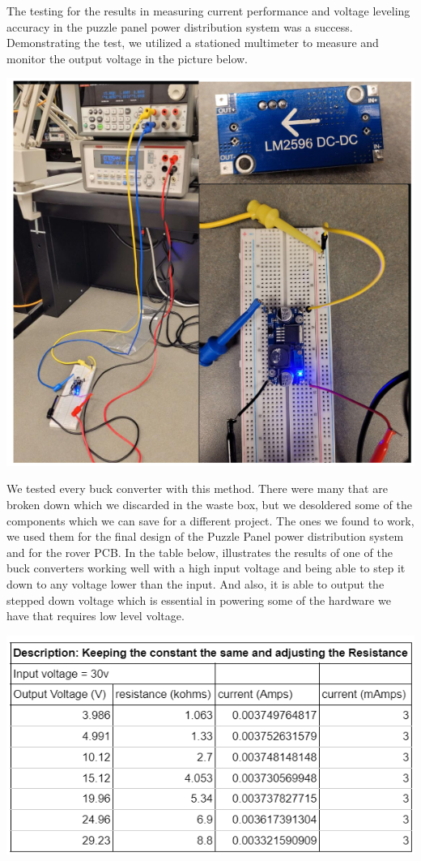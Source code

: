 \documentclass[a4paper, 10pt]{article}
\begin{document}
The testing for the results in measuring current performance and voltage leveling accuracy in the puzzle panel power distribution system was a success. Demonstrating the test, we utilized a stationed multimeter to measure and monitor the output voltage in the picture below. 

\includegraphics[scale=0.7]{LM2956 Testing Picture}

We tested every buck converter with this method. There were many that are broken down which we discarded in the waste box, but we desoldered some of the components which we can save for a different project. The ones we found to work, we used them for the final design of the Puzzle Panel power distribution system and for the rover PCB. In the table below, illustrates the results of one of the buck converters working well with a high input voltage and being able to step it down to any voltage lower than the input. And also, it is able to output the stepped down voltage which is essential in powering some of the hardware we have that requires low level voltage. 

\includegraphics[scale=0.8]{Buck Converter Test Result}
\end{document}

